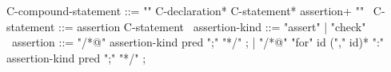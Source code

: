 \begin{syntax}
  C-compound-statement ::= "{" C-declaration* C-statement* assertion+ "}"
        \
  C-statement ::= assertion C-statement \
  assertion-kind ::= "assert" | "check" \
  assertion ::= "/*@" assertion-kind pred ";" "*/" ;
  | "/*@" "for" id ("," id)* ":" assertion-kind pred ";" "*/" ;
\end{syntax}
